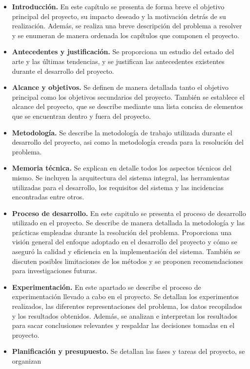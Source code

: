 \begin{itemize}
    \item \textbf{Introducción.} En este capítulo se presenta de forma breve el objetivo 
    principal del proyecto, su impacto deseado y la motivación detrás de su realización. 
    Además, se realiza una  breve descripción del problema a resolver y se enumeran de manera 
    ordenada los capítulos que componen el proyecto.
    \item \textbf{Antecedentes y justificación.} Se proporciona un estudio del estado del 
    arte y las últimas tendencias, y se justifican las antecedentes existentes durante el 
    desarrollo del proyecto.
    \item \textbf{Alcance y objetivos.} Se definen de manera detallada tanto el objetivo 
    principal como los objetivos secundarios del proyecto. También se establece el alcance 
    del proyecto, que se describe mediante una lista concisa de elementos que se encuentran 
    dentro y fuera del proyecto.
    \item \textbf{Metodología.} Se describe la metodología de trabajo utilizada durante el
    desarrollo del proyecto, asi como la metodología creada para la resolución del problema.
    \item \textbf{Memoria técnica.} Se explican en detalle todos los aspectos técnicos del mismo. 
    Se incluyen la arquitectura del sistema integral, las herramientas utilizadas para el desarrollo, 
    los requisitos del sistema y las incidencias encontradas entre otros.
    \item \textbf{Proceso de desarrollo.} En este capitulo se presenta el proceso de desarrollo 
    utilizado en el proyecto. Se describe de manera detallada la metodología y las prácticas 
    empleadas durante la resolución del problema. Proporciona una visión general del enfoque 
    adoptado en el desarrollo del proyecto y cómo se aseguró la calidad y eficiencia en la 
    implementación del sistema. También se discuten posibles limitaciones de los métodos 
    y se proponen recomendaciones para investigaciones futuras.
    \item \textbf{Experimentación.} En este apartado se describe el proceso de experimentación 
    llevado a cabo en el proyecto. Se detallan los experimentos realizados, las diferentes
    representaciones del problema, los datos recopilados y los resultados obtenidos. Además, 
    se analizan e interpretan los resultados para sacar conclusiones relevantes y respaldar 
    las decisiones tomadas en el proyecto.  
    \item \textbf{Planificación y presupuesto.} Se detallan las fases y tareas del proyecto, se organizan 

\end{itemize}
